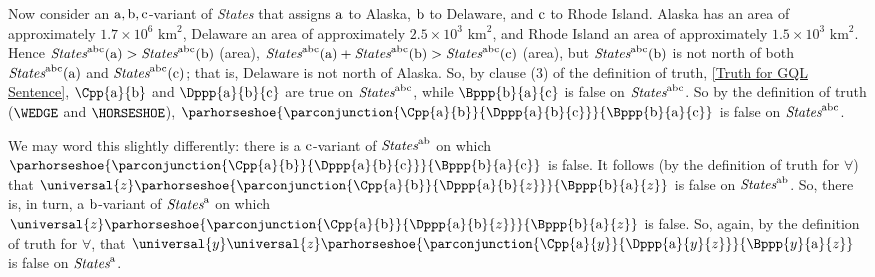 \begin{PROOF}
Now consider an $\mathrm{a},\mathrm{b},\mathrm{c}$-variant of \emph{States} that assigns $\mathrm{a}$ to Alaska, $\mathrm{b}$ to Delaware, and $\mathrm{c}$ to Rhode Island.  
Alaska has an area of approximately $1.7\times{}10^6\text{ km}^2$, Delaware an area of approximately $2.5\times{}10^3\text{ km}^2$, and Rhode Island an area of approximately $1.5\times{}10^3\text{ km}^2$.
Hence $\emph{States}^{\mathrm{a}\mathrm{b}\mathrm{c}}(\mathrm{a})>\emph{States}^{\mathrm{a}\mathrm{b}\mathrm{c}}(\mathrm{b})$ (area), $\emph{States}^{\mathrm{a}\mathrm{b}\mathrm{c}}(\mathrm{a})+\emph{States}^{\mathrm{a}\mathrm{b}\mathrm{c}}(\mathrm{b})>\emph{States}^{\mathrm{a}\mathrm{b}\mathrm{c}}(\mathrm{c})$ (area), but $\emph{States}^{\mathrm{a}\mathrm{b}\mathrm{c}}(\mathrm{b})$ is not north of both $\emph{States}^{\mathrm{a}\mathrm{b}\mathrm{c}}(\mathrm{a})$ and $\emph{States}^{\mathrm{a}\mathrm{b}\mathrm{c}}(\mathrm{c})$; that is, Delaware is not north of Alaska. 
So, by clause (3) of the definition of truth, \ref{Truth for GQL Sentence}, $\Cpp{\constant{a}}{\constant{b}}$ and $\Dppp{\constant{a}}{\constant{b}}{\constant{c}}$ are true on $\emph{States}^{\mathrm{a}\mathrm{b}\mathrm{c}}$, while $\Bppp{\constant{b}}{\constant{a}}{\constant{c}}$ is false on $\emph{States}^{\mathrm{a}\mathrm{b}\mathrm{c}}$. 
So by the definition of truth ($\WEDGE$ and $\HORSESHOE$), $\parhorseshoe{\parconjunction{\Cpp{\constant{a}}{\constant{b}}}{\Dppp{\constant{a}}{\constant{b}}{\constant{c}}}}{\Bppp{\constant{b}}{\constant{a}}{\constant{c}}}$ is false on $\emph{States}^{\mathrm{a}\mathrm{b}\mathrm{c}}$. 

We may word this slightly differently: there is a $\mathrm{c}$-variant of $\emph{States}^{\mathrm{a}\mathrm{b}}$ on which $\parhorseshoe{\parconjunction{\Cpp{\constant{a}}{\constant{b}}}{\Dppp{\constant{a}}{\constant{b}}{\constant{c}}}}{\Bppp{\constant{b}}{\constant{a}}{\constant{c}}}$ is false.  It follows (by the definition of truth for $\forall$) that $\universal{\variable{z}}\parhorseshoe{\parconjunction{\Cpp{\constant{a}}{\constant{b}}}{\Dppp{\constant{a}}{\constant{b}}{\variable{z}}}}{\Bppp{\constant{b}}{\constant{a}}{\variable{z}}}$ is false on $\emph{States}^{\mathrm{a}\mathrm{b}}$.  So, there is, in turn, a $\mathrm{b}$-variant of $\emph{States}^{\mathrm{a}}$ on which $\universal{\variable{z}}\parhorseshoe{\parconjunction{\Cpp{\constant{a}}{\constant{b}}}{\Dppp{\constant{a}}{\constant{b}}{\variable{z}}}}{\Bppp{\constant{b}}{\constant{a}}{\variable{z}}}$ is false.  So, again, by the definition of truth for $\forall$, that $\universal{\variable{y}}\universal{\variable{z}}\parhorseshoe{\parconjunction{\Cpp{\constant{a}}{\variable{y}}}{\Dppp{\constant{a}}{\variable{y}}{\variable{z}}}}{\Bppp{\variable{y}}{\constant{a}}{\variable{z}}}$ is false on $\emph{States}^{\mathrm{a}}$.


\end{PROOF}
